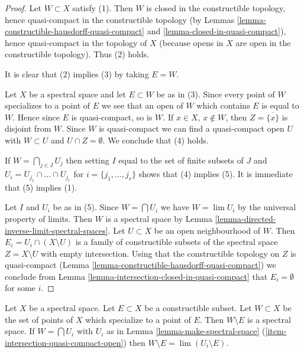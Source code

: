 \begin{proof}
Let $W \subset X$ satisfy (1). Then $W$ is closed in the constructible
topology, hence quasi-compact in the constructible topology (by
Lemmas \ref{lemma-constructible-hausdorff-quasi-compact} and
\ref{lemma-closed-in-quasi-compact}), hence quasi-compact in the topology
of $X$ (because opens in $X$ are open in the constructible topology). Thus
(2) holds.

\medskip\noindent
It is clear that (2) implies (3) by taking $E = W$.

\medskip\noindent
Let $X$ be a spectral space and let $E \subset W$ be as in (3).
Since every point of $W$ specializes to a point of $E$ we see that
an open of $W$ which contains $E$ is equal to $W$. Hence since $E$
is quasi-compact, so is $W$.
If $x \in X$, $x \not \in W$, then $Z = \overline{\{x\}}$ is
disjoint from $W$. Since $W$ is quasi-compact we can find a
quasi-compact open $U$ with $W \subset U$ and $U \cap Z = \emptyset$.
We conclude that (4) holds.

\medskip\noindent
If $W = \bigcap_{j \in J} U_j$ then setting $I$ equal to the set of
finite subsets of $J$ and $U_i = U_{j_1} \cap \ldots \cap U_{j_r}$
for $i = \{j_1, \ldots, j_r\}$ shows that (4) implies (5). It is immediate
that (5) implies (1).

\medskip\noindent
Let $I$ and $U_i$ be as in (5).
Since $W = \bigcap U_i$ we have $W = \lim U_i$ by the universal property
of limits. Then $W$ is a spectral space by
Lemma \ref{lemma-directed-inverse-limit-spectral-spaces}.
Let $U \subset X$ be an open neighbourhood of $W$.
Then $E_i = U_i \cap (X \setminus U)$ is a family of constructible
subsets of the spectral space $Z = X \setminus U$
with empty intersection. Using that the constructible topology on $Z$
is quasi-compact (Lemma \ref{lemma-constructible-hausdorff-quasi-compact})
we conclude from
Lemma \ref{lemma-intersection-closed-in-quasi-compact}
that $E_i = \emptyset$ for some $i$.
\end{proof}

\begin{lemma}
\label{lemma-make-spectral-space-minus}
Let $X$ be a spectral space. Let $E \subset X$ be a constructible subset.
Let $W \subset X$ be the set of points of $X$ which specialize
to a point of $E$. Then $W \setminus E$ is a spectral space.
If $W = \bigcap U_i$ with $U_i$ as in
Lemma \ref{lemma-make-spectral-space}
(\ref{item-intersection-quasi-compact-open})
then $W \setminus E = \lim (U_i \setminus E)$.
\end{lemma}

